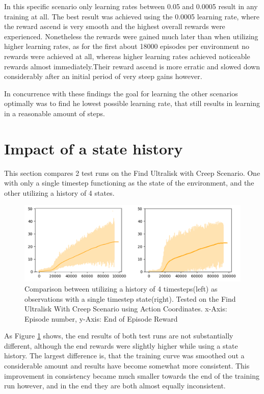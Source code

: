 In this specific scenario only learning rates between 0.05 and 0.0005 result in any training at all. The best result was achieved using the 0.0005 learning rate, where the reward ascend is very smooth and the highest overall rewards were experienced. Nonetheless the rewards were gained much later than when utilizing higher learning rates,  as for the first about 18000 episodes per environment no rewards were achieved at all, whereas higher learning rates achieved noticeable rewards almost immediately.Their reward ascend is more erratic and slowed down considerably after an initial period of very steep gains however.

In concurrence with these findings the goal for learning the other scenarios optimally was to find he lowest possible learning rate, that still results in learning in a reasonable amount of steps.  


\section{Impact of a state history}
This section compares 2 test runs on the Find Ultralisk with Creep Scenario. One with only a single timestep functioning as the state of the environment, and the other utilizing a history of 4 states.

\begin{figure}[htb]
  \centering
      \includegraphics[width=1\textwidth]{Figures/plots/fuwc_history.png}
  \caption{Comparison between utilizing a history of 4 timesteps(left) as observations with a single timestep state(right). Tested on the Find Ultralisk With Creep Scenario using Action Coordinates. x-Axis: Episode number, y-Axis: End of Episode Reward}
  \label{fig:acktr_history}
\end{figure}

As Figure \ref{fig:acktr_history} shows, the end results of both test runs are not substantially different, although the end rewards were slightly higher while using a state history. The largest difference is, that the training curve was smoothed out a considerable amount and results have become somewhat more consistent. This improvement in consistency became much smaller towards the end of the training run however, and in the end they are both almost equally inconsistent. 

